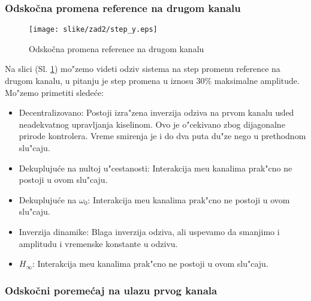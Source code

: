 \documentclass[a4paper,11pt]{article}
\theoremstyle{definition} \newtheorem{deff}{Definicija}[section]
\theoremstyle{definition} \newtheorem{prim}[deff]{Primer}
\theoremstyle{plain} \newtheorem{teor}[deff]{Teorema}
\begin{document}
			\subsubsection{Odskočna promena reference na drugom kanalu}
			\begin{figure}[!ht]
				\centering
				\texttt{[image: slike/zad2/step\_y.eps]}
				\caption{Odskočna promena reference na drugom kanalu}
				\label{fig:step_y}
			\end{figure}
			\vspace{1cm}
			Na slici (Sl. \ref{fig:step_y}) mo"zemo videti odziv sistema na step promenu reference na drugom kanalu, u pitanju je step promena u iznosu 30\% maksimalne amplitude. Mo"zemo primetiti slede\'ce:
			\begin{itemize}
				\item Decentralizovano: Postoji izra"zena inverzija odziva na prvom kanalu usled neadekvatnog upravljanja kiselinom. Ovo je o"cekivano zbog dijagonalne prirode kontrolera. Vreme smirenja je i do dva puta du"ze nego u prethodnom slu"caju.
				
				\item Dekupluju\'ce na nultoj u"cestanosti: Interakcija me\dj{}u kanalima prak"cno ne postoji u ovom slu"caju.
				
				\item Dekupluju\'ce na $\omega_0$: Interakcija me\dj{}u kanalima prak"cno ne postoji u ovom slu"caju.
				
				\item Inverzija dinamike: Blaga inverzija odziva, ali uspevamo da smanjimo i amplitudu i vremenske konstante u odzivu.
				
				\item $H_{\infty}$: Interakcija me\dj{}u kanalima prak"cno ne postoji u ovom slu"caju.
				
			\end{itemize}
			
			
			\clearpage
			\subsubsection{Odskočni poremećaj na ulazu prvog kanala}
			
\end{document}
